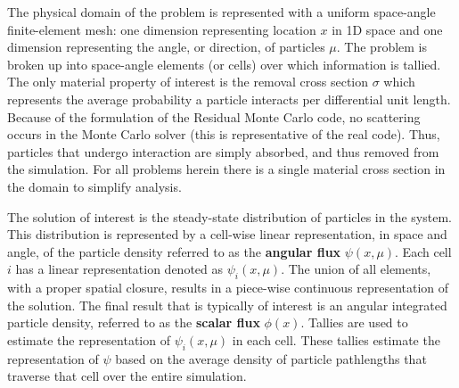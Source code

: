 \documentclass[12pt]{article}
\begin{document}
The physical domain of the problem is represented with a uniform space-angle
finite-element  mesh: one
dimension representing location $x$ in 1D space and one dimension representing the
angle, or direction, of particles $\mu$.  The problem is broken up into space-angle
elements (or cells) over which information is tallied.
The only material property of interest is the removal cross section $\sigma$ which
represents the average probability a particle interacts per differential unit length. Because of the formulation of the Residual Monte Carlo code, no
scattering occurs in the Monte Carlo solver (this is representative of the real code).  Thus, particles that undergo interaction are simply absorbed, and
thus removed from the simulation.  For
all problems herein there is a single material cross section in the domain to
simplify analysis.  

The solution of interest is the steady-state
distribution of particles in the system. This distribution is represented by
a cell-wise linear representation, in space and angle, of the particle density
referred to as the
\textbf{angular flux} $\psi(x,\mu)$. Each cell $i$ has a linear representation denoted as
$\psi_i(x,\mu)$.  The union of all elements, with a proper
spatial closure, results in a piece-wise continuous representation of the solution.  The final result that is typically of interest
is an angular integrated particle density, referred to as the \textbf{scalar flux} 
$\phi(x)$. Tallies are used to estimate the representation of $\psi_i(x,\mu)$ in
each cell.  These tallies estimate the representation of $\psi$ based on the average
density of particle pathlengths that traverse that cell over the entire simulation.
\end{document}
